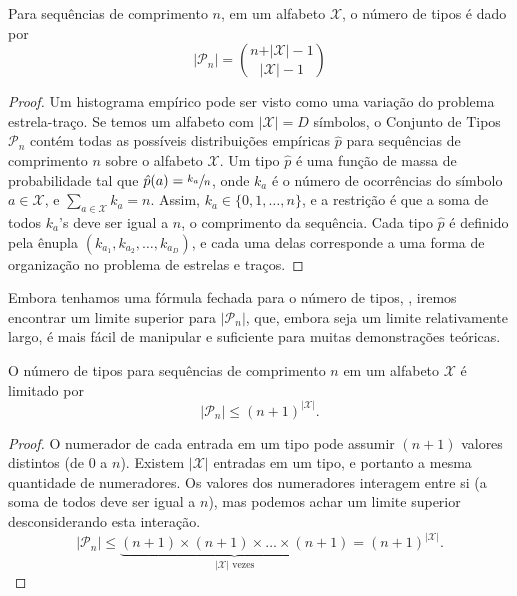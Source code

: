 \begin{theorem}\label{thm:numtiposn}
 Para sequências de comprimento $n$, em um alfabeto $\mathcal{X}$, o número de tipos é dado por
 \begin{equation}\label{eq:number-of-types}
 \vert \mathcal{P}_n \vert = {n + \vert \mathcal{X} \vert - 1 \choose \vert \mathcal{X} \vert - 1}
 \end{equation}
\end{theorem}
\begin{proof}
Um histograma empírico pode ser visto como uma variação do problema estrela-traço.
Se temos um alfabeto com $\vert\mathcal{X}\vert = D$ símbolos,
o Conjunto de Tipos $\mathcal{P}_n$ contém todas as possíveis distribuições empíricas $\hat{p}$
para sequências de comprimento $n$ sobre o alfabeto $\mathcal{X}$.
Um tipo $\hat{p}$ é uma função de massa de probabilidade tal que $\hat{p}(a) = \sfrac{k_a}{n}$,
onde $k_a$ é o número de ocorrências do símbolo $a \in \mathcal{X}$, e
$\sum_{a \in \mathcal{X}} k_a = n$. Assim, $k_a \in \{0,1, \ldots, n\}$, e a restrição
é que a soma de todos $k_a$'s deve ser igual a $n$, o comprimento da sequência.
Cada tipo $\hat{p}$ é definido pela ênupla $(k_{a_1}, k_{a_2}, \ldots, k_{a_D})$, e cada
uma delas corresponde a uma forma de organização no problema de estrelas e traços.
\end{proof}


Embora tenhamos uma fórmula fechada para o número de tipos, ,
iremos encontrar um limite superior para $\vert \mathcal{P}_n \vert$,
que, embora seja um limite relativamente largo, é mais fácil de manipular e suficiente 
para muitas demonstrações teóricas. 

\begin{theorem}
 O número de tipos para sequências de comprimento $n$ em um alfabeto $\mathcal{X}$ é limitado por
 \begin{equation}\label{eq:number-of-types-bound}
 \vert \mathcal{P}_n \vert \leq (n+1)^{\vert \mathcal{X} \vert} .
 \end{equation}
\end{theorem}

\begin{proof}
 O numerador de cada entrada em um tipo pode assumir $(n+1)$ valores distintos (de $0$ a $n$).
 Existem $\vert \mathcal{X} \vert$ entradas em um tipo, e portanto a mesma quantidade de numeradores.
 Os valores dos numeradores interagem entre si (a soma de todos deve ser igual a $n$), mas podemos
 achar um limite superior desconsiderando esta interação.
 \begin{equation}
 \vert \mathcal{P}_n \vert \leq \underbrace{(n+1)\times(n+1)\times\ldots\times(n+1)}_{\vert \mathcal{X} \vert \text{ vezes}} = (n+1)^{\vert \mathcal{X} \vert} .
 \end{equation}
\end{proof}

